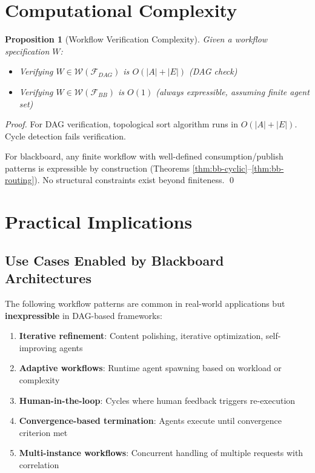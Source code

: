 \documentclass[11pt]{article}
\newtheorem{proposition}[theorem]{Proposition}
\begin{document}
\section{Computational Complexity}

\begin{proposition}[Workflow Verification Complexity]
Given a workflow specification $W$:
\begin{itemize}
    \item Verifying $W \in \mathcal{W}(\mathcal{F}_{DAG})$ is $O(|A| + |E|)$ (DAG check)
    \item Verifying $W \in \mathcal{W}(\mathcal{F}_{BB})$ is $O(1)$ (always expressible, assuming finite agent set)
\end{itemize}
\end{proposition}

\begin{proof}
For DAG verification, topological sort algorithm runs in $O(|A| + |E|)$. Cycle detection fails verification.

For blackboard, any finite workflow with well-defined consumption/publish patterns is expressible by construction (Theorems \ref{thm:bb-cyclic}--\ref{thm:bb-routing}). No structural constraints exist beyond finiteness. \qed
\end{proof}

\section{Practical Implications}

\subsection{Use Cases Enabled by Blackboard Architectures}

The following workflow patterns are common in real-world applications but \textbf{inexpressible} in DAG-based frameworks:

\begin{enumerate}
    \item \textbf{Iterative refinement}: Content polishing, iterative optimization, self-improving agents
    \item \textbf{Adaptive workflows}: Runtime agent spawning based on workload or complexity
    \item \textbf{Human-in-the-loop}: Cycles where human feedback triggers re-execution
    \item \textbf{Convergence-based termination}: Agents execute until convergence criterion met
    \item \textbf{Multi-instance workflows}: Concurrent handling of multiple requests with correlation
\end{enumerate}
\end{document}
